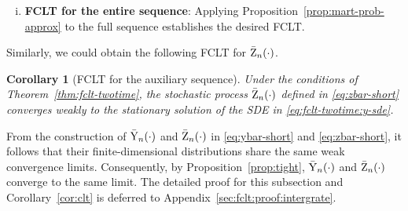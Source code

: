 \documentclass[11pt]{article}
\theoremstyle{plain}
\newtheorem{cor}{Corollary}[section]
\theoremstyle{definition}
\def\invdiffslow{\tilde{\beta}}
\def\ermW{{\textnormal{W}}}
\def\ermX{{\textnormal{X}}}
\def\ermY{{\textnormal{Y}}}
\def\mI{{\bm{I}}}
\newcommand{\xbar}{{\bar{\textnormal{X}}}}
\newcommand{\ybar}{{\bar{\textnormal{Y}}}}
\newcommand{\zbar}{{\bar{\textnormal{Z}}}}
\def\mI{{I}}
\def\weakconverge{\Rightarrow}
\begin{document}
\begin{enumerate}[(i)]
%	
		
	\item \textbf{FCLT for the entire sequence}: Applying Proposition~\ref{prop:mart-prob-approx} to the full sequence establishes the desired FCLT.
\end{enumerate}
Similarly, we could obtain the following FCLT for $\zbar_{n}(\cdot)$.
\begin{cor}[FCLT for the auxiliary sequence]\label{cor:fclt-z}
	Under the conditions of Theorem~\ref{thm:fclt-twotime},
	the stochastic process $\zbar_{n}(\cdot)$ defined in \eqref{eq:zbar-short} converges weakly to the stationary solution of the SDE in \eqref{eq:fclt-twotime:y-sde}.
\end{cor}

From the construction of $\ybar_{n}(\cdot)$ and $\zbar_{n}(\cdot)$ in \eqref{eq:ybar-short} and \eqref{eq:zbar-short}, it follows that their finite-dimensional distributions share the same weak convergence limits. Consequently, by Proposition~\ref{prop:tight}, $\ybar_{n}(\cdot)$ and $\zbar_{n}(\cdot)$ converge to the same limit. The detailed proof for this subsection and Corollary~\ref{cor:clt} is deferred to Appendix~\ref{sec:fclt:proof:intergrate}.
\end{document}
